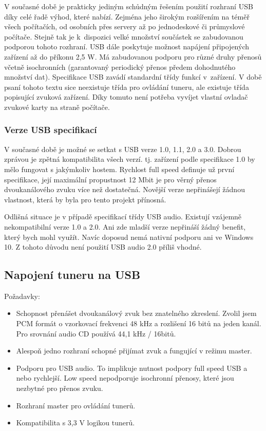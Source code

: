 V současné době je prakticky jediným schůdným řešením použití rozhraní USB díky celé řadě výhod, které nabízí. Zejména jeho širokým rozšířením na téměř všech počítačích, od osobních přes servery až po jednodeskové či průmyslové počítače. Stejně tak je k~dispozici velké množství součástek se zabudovanou podporou tohoto rozhraní. USB dále poskytuje možnost napájení připojených zařízení až do příkonu 2,5 W. Má zabudovanou podporu pro různé druhy přenosů včetně isochronních (garantovaný periodický přenos předem dohodnutého množství dat). Specifikace USB zavádí standardní třídy funkcí v~zařízení. V době psaní tohoto textu sice neexistuje třída pro ovládání tuneru, ale existuje třída popisující zvuková zařízení. Díky tomuto není potřeba vyvíjet vlastní ovladač zvukové karty na straně počítače.
\subsubsection{Verze USB specifikací}
V současné době je možné se setkat s USB verze 1.0, 1.1, 2.0 a 3.0. Dobrou zprávou je zpětná kompatibilita všech verzí. tj. zařízení podle specifikace 1.0 by mělo fungovat s jakýmkoliv hostem. Rychlost full speed definuje už první specifikace, její maximální propustnost 12 Mbit je pro věrný přenos dvoukanálového zvuku více než dostatečná. Novější verze nepřinášejí žádnou vlastnost, která by byla pro tento projekt přínosná.

Odlišná situace je v případě specifikací třídy USB audio. Existují vzájemně nekompatibilní verze 1.0 a 2.0. Ani zde mladší verze nepřináší žádný benefit, který bych mohl využít. Navíc doposud nemá nativní podporu ani ve Windows 10. Z tohoto důvodu není použití USB audio 2.0 příliš vhodné.


\subsection{Napojení tuneru na USB}
Požadavky:

\begin{itemize}
\item{Schopnost přenášet dvoukanálový zvuk bez znatelného zkreslení. Zvolil jsem PCM formát o vzorkovací frekvenci 48 kHz a rozlišení 16 bitů na jeden kanál. Pro srovnání audio CD používá 44,1 kHz / 16bitů.}
\item{Alespoň jedno rozhraní \iis schopné přijímat zvuk a fungující v režimu master.}
\item{Podporu pro USB audio. To implikuje nutnost podpory full speed USB a nebo rychlejší. Low speed nepodporuje isochronní přenosy, které jsou nezbytné pro přenos zvuku.}
\item{Rozhraní \iic master pro ovládání tunerů.}
\item{Kompatibilita s 3,3 V logikou tunerů.}
\end{itemize}


